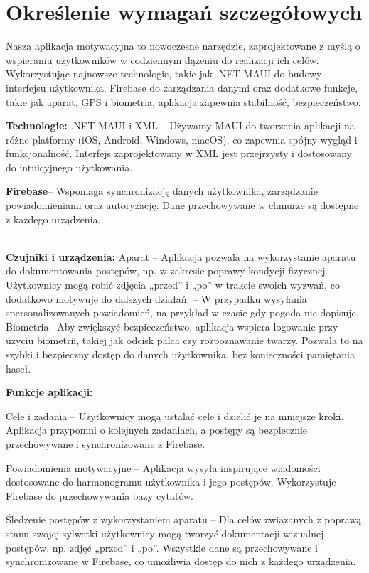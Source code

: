 \newpage
\section{Określenie wymagań szczegółowych}		%


Nasza aplikacja motywacyjna to nowoczesne narzędzie, zaprojektowane z myślą o wspieraniu użytkowników w codziennym dążeniu do realizacji ich celów. Wykorzystując najnowsze technologie, takie jak .NET MAUI do budowy interfejsu użytkownika, Firebase do zarządzania danymi oraz dodatkowe funkcje, takie jak aparat, GPS i biometria, aplikacja zapewnia stabilność, bezpieczeństwo.


\textbf{\large{Technologie:} } .NET MAUI i XML – Używamy MAUI do tworzenia aplikacji na różne platformy (iOS, Android, Windows, macOS), co zapewnia spójny wygląd i funkcjonalność. Interfejs zaprojektowany w XML jest przejrzysty i dostosowany do intuicyjnego użytkowania.

    \textbf{Firebase}– Wspomaga synchronizację danych użytkownika, zarządzanie powiadomieniami oraz autoryzację. Dane przechowywane w chmurze są dostępne z każdego urządzenia.

 

    \\
      \textbf{\large{ Czujniki i urządzenia:} } Aparat – Aplikacja pozwala na wykorzystanie aparatu do dokumentowania postępów, np. w zakresie poprawy kondycji fizycznej. Użytkownicy mogą robić zdjęcia „przed” i „po” w trakcie swoich wyzwań, co dodatkowo motywuje do dalszych działań.
       \GPS– W przypadku wysyłania spersonalizowanych powiadomień, na przykład w czasie gdy pogoda nie dopisuje.
        Biometria– Aby zwiększyć bezpieczeństwo, aplikacja wspiera logowanie przy użyciu biometrii, takiej jak odcisk palca czy rozpoznawanie twarzy. Pozwala to na szybki i bezpieczny dostęp do danych użytkownika, bez konieczności pamiętania haseł.

\textbf{{\large Funkcje aplikacji:}}

    Cele i zadania – Użytkownicy mogą ustalać cele i dzielić je na mniejsze kroki. Aplikacja przypomni o kolejnych zadaniach, a postępy są bezpiecznie przechowywane i synchronizowane z Firebase.

    Powiadomienia motywacyjne – Aplikacja wysyła inspirujące wiadomości dostosowane do harmonogramu użytkownika i jego postępów. Wykorzystuje Firebase do przechowywania bazy cytatów.

    Śledzenie postępów z wykorzystaniem  aparatu – Dla celów związanych z poprawą stanu swojej sylwetki użytkownicy mogą tworzyć dokumentacji wizualnej postępów, np. zdjęć „przed” i „po”. Wszystkie dane są przechowywane i synchronizowane w Firebase, co umożliwia dostęp do nich z każdego urządzenia.

